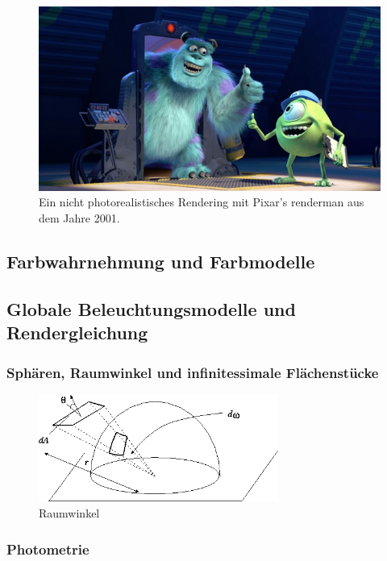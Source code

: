  \begin{figure}[H]
    \centering
    \includegraphics[height=0.5\textwidth]{images/pixar.jpg}
    \caption{Ein nicht photorealistisches Rendering mit Pixar's renderman aus dem Jahre 2001.}
    \label{fig:cray}
\end{figure}

\subsection{Farbwahrnehmung und Farbmodelle}

\subsection{Globale Beleuchtungsmodelle und Rendergleichung}

\subsubsection{Sphären, Raumwinkel und infinitessimale Flächenstücke}

 \begin{figure}[H]
    \centering
    \includegraphics[width=0.7\textwidth]{images/solidangle.png}
    \caption{Raumwinkel}
    \label{fig:cray}
\end{figure}

\subsubsection{Photometrie}

